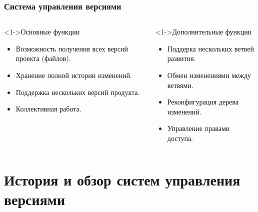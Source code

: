 \documentclass[pdf,9pt,aspectratio=169]{beamer}
\begin{document}
\begin{frame}\frametitle{Система управления версиями}
  \begin{columns}[T]
    \begin{column}[]{0.45\textwidth}  
      \begin{block}<1->{Основные функции}
        \begin{itemize}
          \item Возможность получения всех версий проекта (файлов).
          \item Хранение полной истории изменений.
          \item Поддержка нескольких версий продукта.
          \item Коллективная работа.
        \end{itemize}
      \end{block}
    \end{column}
    \begin{column}[]{0.45\textwidth}  
      \begin{block}<1->{Дополнительные функции}
        \begin{itemize}
          \item Поддерка нескольких ветвей развития.
          \item Обмен изменениями между ветвями.
          \item Реконфигурация дерева изменений.
          \item Управление правами доступа.
        \end{itemize}
      \end{block}
    \end{column}
  \end{columns}
\end{frame}

\section{История и обзор систем управления версиями}
\end{document}
